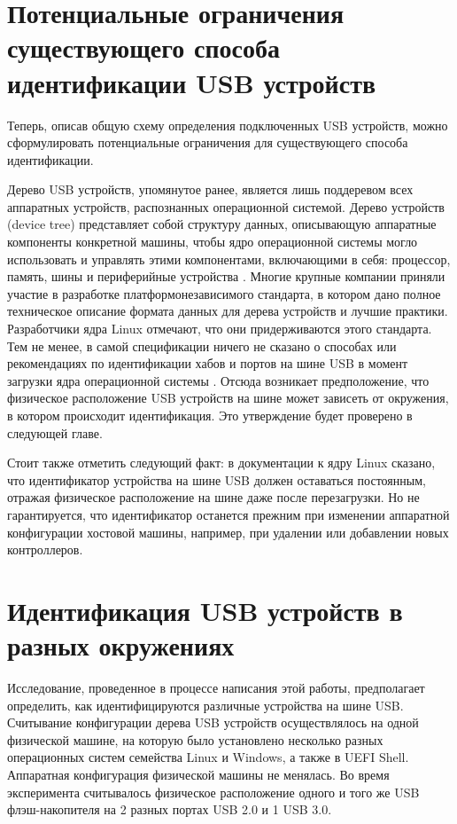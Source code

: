 \clearpage
\section{Потенциальные ограничения существующего способа идентификации USB устройств}
Теперь, описав общую схему определения подключенных USB устройств, можно сформулировать потенциальные ограничения для существующего
способа идентификации.
\par
Дерево USB устройств, упомянутое ранее, является лишь поддеревом всех аппаратных устройств, распознанных операционной системой. Дерево устройств
(device tree) представляет собой структуру данных, описывающую аппаратные компоненты конкретной машины, чтобы ядро операционной системы
могло использовать и управлять этими компонентами, включающими в себя: процессор, память, шины и периферийные устройства \cite{devtree}.
Многие крупные компании приняли участие в разработке платформонезависимого стандарта, в котором дано полное техническое описание
формата данных для дерева устройств и лучшие практики. Разработчики ядра Linux отмечают, что они придерживаются этого стандарта. Тем не менее,
в самой спецификации ничего не сказано о способах или рекомендациях по идентификации хабов и портов на шине USB в момент загрузки
ядра операционной системы \cite{usb_spec}.
Отсюда возникает предположение, что физическое расположение USB устройств на шине может зависеть от окружения, в котором происходит идентификация.
Это утверждение будет проверено в следующей главе.
\par
Стоит также отметить следующий факт: в документации к ядру Linux сказано, что идентификатор устройства на шине USB должен
оставаться постоянным, отражая физическое расположение на шине даже после перезагрузки. Но не гарантируется, что идентификатор
останется прежним при изменении аппаратной конфигурации хостовой машины, например, при удалении или добавлении новых контроллеров.

\clearpage
\section{Идентификация USB устройств в разных окружениях}
Исследование, проведенное в процессе написания этой работы, предполагает определить, как идентифицируются различные устройства на шине USB.
Считывание конфигурации дерева USB устройств осуществлялось на одной физической машине, на которую было установлено несколько разных операционных
систем семейства Linux и Windows, а также в UEFI Shell. Аппаратная конфигурация физической машины не менялась. Во время эксперимента считывалось
физическое расположение одного и того же USB флэш-накопителя на 2 разных портах USB 2.0 и 1 USB 3.0.
